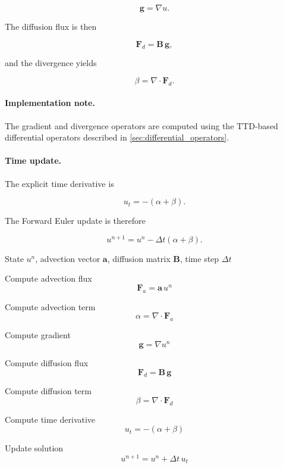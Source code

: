 \documentclass[11pt,a4paper,parskip=half-]{scrartcl}
\theoremstyle{definition}
\theoremstyle{plain}
\theoremstyle{remark}
\begin{document}
\[
\mathbf g
=
\nabla u.
\]

The diffusion flux is then

\[
\mathbf F_d
=
\mathbf B\,\mathbf g,
\]

and the divergence yields

\[
\beta
=
\nabla\cdot\mathbf F_d.
\]

\paragraph{Implementation note.}
The gradient and divergence operators are computed using the
TTD-based differential operators described in
\cref{sec:differential_operators}.

\paragraph{Time update.}

The explicit time derivative is

\[
u_t
=
-(\alpha+\beta).
\]

The Forward Euler update is therefore

\[
u^{n+1}
=
u^n
-
\Delta t
(\alpha+\beta).
\]

\begin{algorithm}[ht]
  \caption{Explicit finite difference time step}
  \label{alg:explicit_fd}
  \begin{algorithmic}[1]

    \Require State $u^n$, advection vector $\mathbf a$,
    diffusion matrix $\mathbf B$, time step $\Delta t$

    \State Compute advection flux
    \[
      \mathbf F_a = \mathbf a\,u^n
    \]

    \State Compute advection term
    \[
      \alpha = \nabla\cdot\mathbf F_a
    \]

    \State Compute gradient
    \[
      \mathbf g = \nabla u^n
    \]

    \State Compute diffusion flux
    \[
      \mathbf F_d = \mathbf B\,\mathbf g
    \]

    \State Compute diffusion term
    \[
      \beta = \nabla\cdot\mathbf F_d
    \]

    \State Compute time derivative
    \[
      u_t = -(\alpha+\beta)
    \]

    \State Update solution
    \[
      u^{n+1}
      =
      u^n + \Delta t\,u_t
    \]

  \end{algorithmic}
\end{algorithm}
\end{document}
